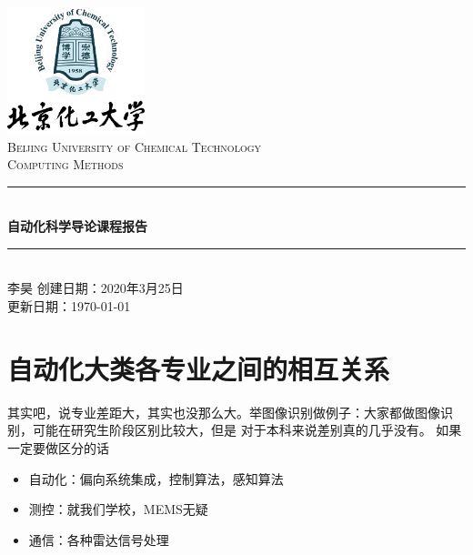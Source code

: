 \documentclass[cs4size,a4paper]{ctexart}
\numberwithin{equation}{section}
\numberwithin{table}{section}
\numberwithin{figure}{section}
\newcommand{\HRule}{\rule{\linewidth}{0.5mm}}
\begin{document}
\newtheorem{example}{例}              	%
\newtheorem{algorithem}{算法}	
\newtheorem{theorem}{定理}            	%
\newtheorem{definition}{定义}
\newtheorem{axiom}{公理}
\newtheorem{property}{性质}
\newtheorem{proposition}{命题}
\newtheorem{lemma}{引理}
\newtheorem{corollary}{推论}
\newtheorem{remark}{注解}
\newtheorem{condition}{条件}
\newtheorem{conclusion}{结论}
\newtheorem{assumption}{假设}
\renewcommand{\contentsname}{目录}     
\renewcommand{\abstractname}{摘要} 
\renewcommand{\refname}{参考文献}     
\renewcommand{\indexname}{索引}
\renewcommand{\figurename}{图}
\renewcommand{\tablename}{表}
\renewcommand{\appendixname}{附录}
\renewcommand{\proofname}{证明}
\renewcommand\emph[1]{\textcolor{black}{\textbf{#1}}}
\begin{titlepage}
\begin{center}
\includegraphics[width=0.30\textwidth]{logo}\\[1cm]    
\textsc{\Large Beijing University of Chemical Technology}\\[1.0cm]
\textsc{\Large Computing Methods}\\[0.5cm]
\HRule \\[0.8cm]
{\huge \bfseries 自动化科学导论课程报告}\\[0.4cm]
\HRule \\[0.7cm]
\textsc{李昊}
\tableofcontents 
\vfill
{创建日期：2020年3月25日}\\
{更新日期：\today}
\end{center}
\end{titlepage}
\pagestyle{plain}
\thispagestyle{empty}
\pagestyle{fancy}



\section{自动化大类各专业之间的相互关系}
其实吧，说专业差距大，其实也没那么大。举图像识别做例子：大家都做图像识别，可能在研究生阶段区别比较大，但是
对于本科来说差别真的几乎没有。
如果一定要做区分的话
\begin{itemize}
        \item 自动化：偏向系统集成，控制算法，感知算法
        \item 测控：就我们学校，MEMS无疑
        \item 通信：各种雷达信号处理
\end{itemize}
\end{document}
